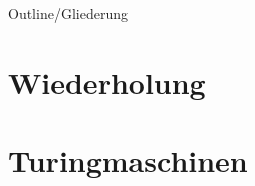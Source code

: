 
\subtitle{Foliensatz 12}
\date{24. Januar 2013}

\newcommand{\sq}{$\square$}
\newcommand{\da}{$\downarrow$}



\begin{frame}
    \titlepage
\end{frame}

\begin{frame}{Outline/Gliederung}
    \tableofcontents
\end{frame}

\section{Wiederholung}
\section{Turingmaschinen}
